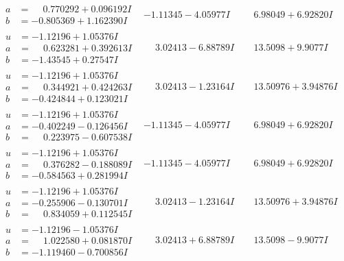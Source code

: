 \documentclass[1p]{elsarticle_modified}
\theoremstyle{definition}
\begin{document}
$$\begin{array}{c|c|c}
\begin{aligned}
a &= \phantom{-}0.770292 + 0.096192 I \\
b &= -0.805369 + 1.162390 I\end{aligned}
 & -1.11345 - 4.05977 I & \phantom{-}6.98049 + 6.92820 I \\ \hline\begin{aligned}
u &= -1.12196 + 1.05376 I \\
a &= \phantom{-}0.623281 + 0.392613 I \\
b &= -1.43545 + 0.27547 I\end{aligned}
 & \phantom{-}3.02413 - 6.88789 I & \phantom{-}13.5098 + 9.9077 I \\ \hline\begin{aligned}
u &= -1.12196 + 1.05376 I \\
a &= \phantom{-}0.344921 + 0.424263 I \\
b &= -0.424844 + 0.123021 I\end{aligned}
 & \phantom{-}3.02413 - 1.23164 I & \phantom{-}13.50976 + 3.94876 I \\ \hline\begin{aligned}
u &= -1.12196 + 1.05376 I \\
a &= -0.402249 - 0.126456 I \\
b &= \phantom{-}0.223975 - 0.607538 I\end{aligned}
 & -1.11345 - 4.05977 I & \phantom{-}6.98049 + 6.92820 I \\ \hline\begin{aligned}
u &= -1.12196 + 1.05376 I \\
a &= \phantom{-}0.376282 - 0.188089 I \\
b &= -0.584563 + 0.281994 I\end{aligned}
 & -1.11345 - 4.05977 I & \phantom{-}6.98049 + 6.92820 I \\ \hline\begin{aligned}
u &= -1.12196 + 1.05376 I \\
a &= -0.255906 - 0.130701 I \\
b &= \phantom{-}0.834059 + 0.112545 I\end{aligned}
 & \phantom{-}3.02413 - 1.23164 I & \phantom{-}13.50976 + 3.94876 I \\ \hline\begin{aligned}
u &= -1.12196 - 1.05376 I \\
a &= \phantom{-}1.022580 + 0.081870 I \\
b &= -1.119460 - 0.700856 I\end{aligned}
 & \phantom{-}3.02413 + 6.88789 I & \phantom{-}13.5098 - 9.9077 I \\ \hline\begin{aligned}

\end{aligned}
\end{array}$$
\end{document}
